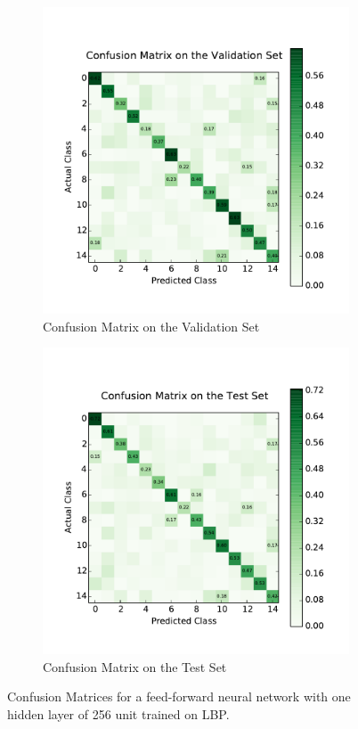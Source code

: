 \begin{figure}[H]
	\centering
	\begin{subfigure}[b]{0.45\linewidth}
		\centering
		\includegraphics[width=\linewidth]{images/1/cm_valid.pdf}
		\caption{Confusion Matrix on the Validation Set}
	\end{subfigure}
	\hfill
	\begin{subfigure}[b]{0.45\linewidth}
		\centering
		\includegraphics[width=\linewidth]{images/1/cm_test.pdf}
		\caption{Confusion Matrix on the Test Set}
	\end{subfigure}
	\caption{Confusion Matrices for a feed-forward neural network with one hidden layer of 256 unit trained on LBP.}
	\label{shrine1_mat}
\end{figure}

